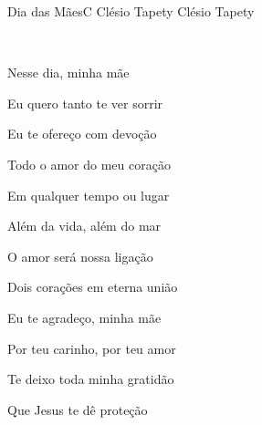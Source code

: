 \documentclass[a4,12pt,oneside]{book}
\newcommand{\RevDate}{\today}
\newcommand{\NotCCLIed}{\relax}
\begin{document}
\begin{song}{Dia das Mães}{C}
  {Clésio Tapety}
  {Clésio Tapety}
  {}
  {\NotCCLIed}
  
	\renewcommand{\RevDate}{09 de maio de 2015}
  
	
	\ifChordBk
		{\vspace{-2em}\flushright{\Cchord \quad \Amchord \quad \Dmchord \quad \Gschord}\\}
	 	 \vspace{-1em}
	\fi
	
	\begin{SBVerse*}
		Nesse dia, minha mãe
		
		Eu quero tanto te ver sorrir
		
		Eu te ofereço com devoção
		
		Todo o amor do meu coração
	\end{SBVerse*}
	
	\begin{SBVerse*}
		Em qualquer tempo ou lugar
		
		Além da vida, além do mar
		
		O amor será nossa ligação
		
		Dois corações em eterna união
	\end{SBVerse*}  

	\begin{SBVerse*}
		Eu te agradeço, minha mãe
		
		Por teu carinho, por teu amor
		
		Te deixo toda minha gratidão
		
		Que Jesus te dê proteção
	\end{SBVerse*}  
\end{song}
\end{document}
